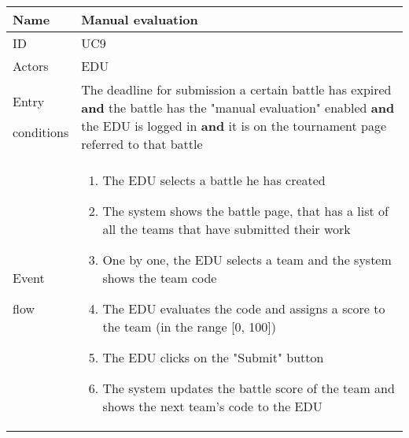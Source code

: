 \begin{center}
    \def\arraystretch{1.5}
    \begin{tabular}{| m{2cm} | m{10cm}|}
        \hline
        Name                  & Manual evaluation                                                                                                                                                                                                        \\ \hline
        ID                    & UC9                                                                                                                                                                                                                      \\ \hline
        Actors                & EDU                                                                                                                                                                                                                      \\ \hline
        Entry \par conditions & The deadline for submission a certain battle has expired \textbf{and} the battle has the "manual evaluation" enabled \textbf{and} the EDU is logged in \textbf{and} it is on the tournament page referred to that battle \\ \hline
        Event \par flow       & \begin{enumerate}
                                    \item The EDU selects a battle he has created
                                    \item The system shows the battle page, that has a list of all the teams that have submitted their work
                                    \item One by one, the EDU selects a team and the system shows the team code
                                    \item The EDU evaluates the code and assigns a score to the team (in the range [0, 100])
                                    \item The EDU clicks on the "Submit" button
                                    \item The system updates the battle score of the team and shows the next team's code to the EDU
                                \end{enumerate}                                                                                                                   \\ \hline

\end{tabular}
\end{center}
